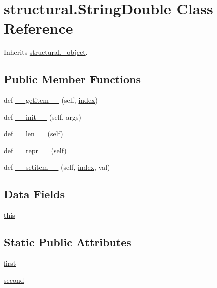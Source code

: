 \hypertarget{classstructural_1_1_string_double}{}\section{structural.\+String\+Double Class Reference}
\label{classstructural_1_1_string_double}


Inherits \hyperlink{classstructural_1_1__object}{structural.\+\_\+object}.

\subsection*{Public Member Functions}
\begin{DoxyCompactItemize}
\item 
def \hyperlink{classstructural_1_1_string_double_af75a89b48ff2ed1307811ee165b97cde}{\+\_\+\+\_\+getitem\+\_\+\+\_\+} (self, \hyperlink{lp__lib_8h_a1499949ec4dbbc5290ece2ac210bba35}{index})
\item 
def \hyperlink{classstructural_1_1_string_double_a4d3f34f046c05e01f942d8ca7d0d393e}{\+\_\+\+\_\+init\+\_\+\+\_\+} (self, args)
\item 
def \hyperlink{classstructural_1_1_string_double_a2cab94a7380df09b75cab15a670786be}{\+\_\+\+\_\+len\+\_\+\+\_\+} (self)
\item 
def \hyperlink{classstructural_1_1_string_double_a5796a432aaea2160521adf28536d578c}{\+\_\+\+\_\+repr\+\_\+\+\_\+} (self)
\item 
def \hyperlink{classstructural_1_1_string_double_a2e8d3fb9d05812011df22174fb176080}{\+\_\+\+\_\+setitem\+\_\+\+\_\+} (self, \hyperlink{lp__lib_8h_a1499949ec4dbbc5290ece2ac210bba35}{index}, val)
\end{DoxyCompactItemize}
\subsection*{Data Fields}
\begin{DoxyCompactItemize}
\item 
\hyperlink{classstructural_1_1_string_double_a5efb1c47641643773fce0f0850bd20c7}{this}
\end{DoxyCompactItemize}
\subsection*{Static Public Attributes}
\begin{DoxyCompactItemize}
\item 
\hyperlink{classstructural_1_1_string_double_ace3af1429e325243cb119aabf4bbe9a0}{first}
\item 
\hyperlink{classstructural_1_1_string_double_aa027c39462539ed87825bf796a174f33}{second}
\end{DoxyCompactItemize}


